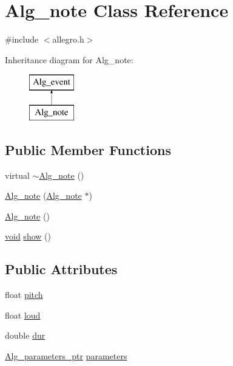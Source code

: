 \hypertarget{class_alg__note}{}\section{Alg\+\_\+note Class Reference}
\label{class_alg__note}


{\ttfamily \#include $<$allegro.\+h$>$}

Inheritance diagram for Alg\+\_\+note\+:\begin{figure}[H]
\begin{center}
\leavevmode
\includegraphics[height=2.000000cm]{class_alg__note}
\end{center}
\end{figure}
\subsection*{Public Member Functions}
\begin{DoxyCompactItemize}
\item 
virtual \hyperlink{class_alg__note_a3787ede39899a7ffa0ff1c7245b9f314}{$\sim$\+Alg\+\_\+note} ()
\item 
\hyperlink{class_alg__note_a6c13b424b85f8e276311e7e61fdf1e6b}{Alg\+\_\+note} (\hyperlink{class_alg__note}{Alg\+\_\+note} $\ast$)
\item 
\hyperlink{class_alg__note_aad65c051b53ce628ac951dabb6c3494e}{Alg\+\_\+note} ()
\item 
\hyperlink{sound_8c_ae35f5844602719cf66324f4de2a658b3}{void} \hyperlink{class_alg__note_a04beaa67227bec1e4bf7a74f65f79528}{show} ()
\end{DoxyCompactItemize}
\subsection*{Public Attributes}
\begin{DoxyCompactItemize}
\item 
float \hyperlink{class_alg__note_a01dc46324d580898c16fe09d2e85c424}{pitch}
\item 
float \hyperlink{class_alg__note_aefa0a5b76a5747b0e95f96bc8046e199}{loud}
\item 
double \hyperlink{class_alg__note_ae15463f6b0deca3ac1a179683dd8e6ee}{dur}
\item 
\hyperlink{allegro_8h_a7367c3f1b2c307bcda6aed01bf8511fa}{Alg\+\_\+parameters\+\_\+ptr} \hyperlink{class_alg__note_ae70e47b4c5fb53e7f90a4fdc0f132d0e}{parameters}
\end{DoxyCompactItemize}
